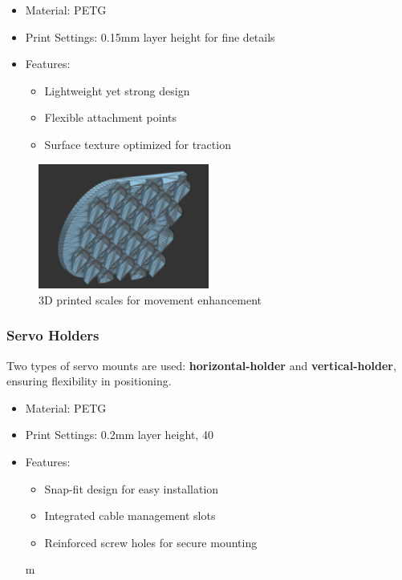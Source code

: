 \documentclass[12pt,a4paper]{report}
\begin{document}
\begin{itemize}
\item Material: PETG
\item Print Settings: 0.15mm layer height for fine details
\item Features:
\begin{itemize}
\item Lightweight yet strong design
\item Flexible attachment points
\item Surface texture optimized for traction
\end{itemize}
\end{itemize}
\begin{figure}[h]
\centering
\includegraphics[width=0.5\textwidth]{media/scales.png}
\caption{3D printed scales for movement enhancement}
\end{figure}

\FloatBarrier
\subsubsection{Servo Holders}

Two types of servo mounts are used: \textbf{horizontal-holder} and \textbf{vertical-holder}, ensuring flexibility in positioning.

\begin{itemize}
\item Material: PETG
\item Print Settings: 0.2mm layer height, 40%
\item Features:
\begin{itemize}
\item Snap-fit design for easy installation
\item Integrated cable management slots
\item Reinforced screw holes for secure mounting
\end{itemize}m
\end{itemize}
\end{document}
